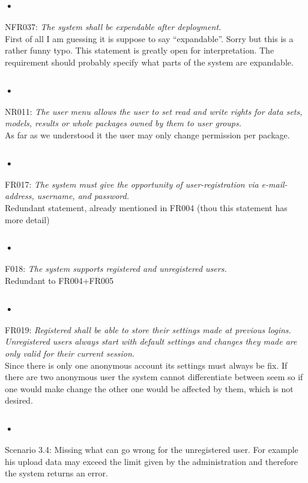 \documentclass{article}
\begin{document}
\subsubsection{•}
NFR037: \textit{The system shall be expendable after deployment.}\\
First of all I am guessing it is suppose to say “expandable”. Sorry but this is a rather funny typo. This statement is greatly open for interpretation. The requirement should probably specify what parts of the system are expandable.

\subsubsection{•}
NR011: \textit{The user menu allows the user to set read and write rights for data sets, models, results or whole packages owned by them to user groups.}\\
As far as we understood it the user may only change permission per package.

\subsubsection{•}
FR017: \textit{The system must give the opportunity of user-registration via e-mail-address, username, and password.}\\ 
Redundant statement, already mentioned in FR004 (thou this statement has more detail)

\subsubsection{•}
F018: \textit{The system supports registered and unregistered users.}\\
Redundant to FR004+FR005

\subsubsection{•}
FR019: \textit{Registered shall be able to store their settings made at previous logins. Unregistered users always start with default settings and changes they made are only valid for their current session.}\\
Since there is only one anonymous account its settings must always be fix. If there are two anonymous user the system cannot differentiate between seem so if one would make change the other one would be affected by them, which is not desired.

\subsubsection{•}
Scenario 3.4: Missing what can go wrong for the unregistered user. For example his upload data may exceed the limit given by the administration and therefore the system returns an error.
\end{document}
